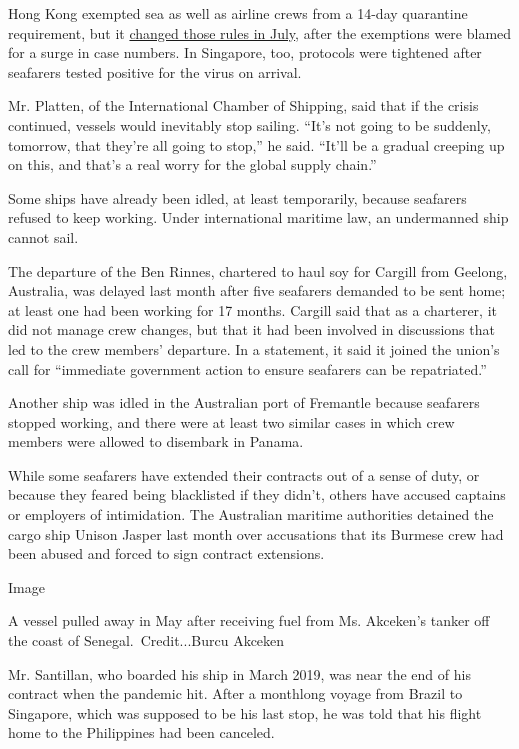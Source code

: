 Hong Kong exempted sea as well as airline crews from a 14-day quarantine
requirement, but it
\href{https://www.maritime-executive.com/article/hong-kong-suspends-crew-changes-except-for-cargo-ships-in-port}{changed
those rules in July}, after the exemptions were blamed for a surge in
case numbers. In Singapore, too, protocols were tightened after
seafarers tested positive for the virus on arrival.

Mr. Platten, of the International Chamber of Shipping, said that if the
crisis continued, vessels would inevitably stop sailing. ``It's not
going to be suddenly, tomorrow, that they're all going to stop,'' he
said. ``It'll be a gradual creeping up on this, and that's a real worry
for the global supply chain.''

Some ships have already been idled, at least temporarily, because
seafarers refused to keep working. Under international maritime law, an
undermanned ship cannot sail.

The departure of the Ben Rinnes, chartered to haul soy for Cargill from
Geelong, Australia, was delayed last month after five seafarers demanded
to be sent home; at least one had been working for 17 months. Cargill
said that as a charterer, it did not manage crew changes, but that it
had been involved in discussions that led to the crew members'
departure. In a statement, it said it joined the union's call for
``immediate government action to ensure seafarers can be repatriated.''

Another ship was idled in the Australian port of Fremantle because
seafarers stopped working, and there were at least two similar cases in
which crew members were allowed to disembark in Panama.

While some seafarers have extended their contracts out of a sense of
duty, or because they feared being blacklisted if they didn't, others
have accused captains or employers of intimidation. The Australian
maritime authorities detained the cargo ship Unison Jasper last month
over accusations that its Burmese crew had been abused and forced to
sign contract extensions.

Image

A vessel pulled away in May after receiving fuel from Ms. Akceken's
tanker off the coast of Senegal.~Credit...Burcu Akceken

Mr. Santillan, who boarded his ship in March 2019, was near the end of
his contract when the pandemic hit. After a monthlong voyage from Brazil
to Singapore, which was supposed to be his last stop, he was told that
his flight home to the Philippines had been canceled.

